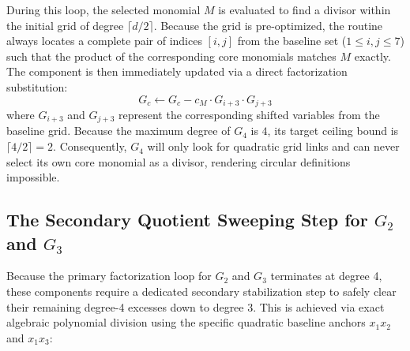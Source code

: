 \documentclass[11pt,a4paper]{article}
\begin{document}
During this loop, the selected monomial $M$ is evaluated to find a divisor within the initial grid of degree $\lceil d/2 \rceil$. Because the grid is pre-optimized, the routine always locates a complete pair of indices $[i, j]$ from the baseline set ($1 \le i, j \le 7$) such that the product of the corresponding core monomials matches $M$ exactly. The component is then immediately updated via a direct factorization substitution:
\begin{equation}
G_c \leftarrow G_c - c_M \cdot G_{i+3} \cdot G_{j+3}
\end{equation}
where $G_{i+3}$ and $G_{j+3}$ represent the corresponding shifted variables from the baseline grid. Because the maximum degree of $G_4$ is $4$, its target ceiling bound is $\lceil 4/2 \rceil = 2$. Consequently, $G_4$ will only look for quadratic grid links and can never select its own core monomial as a divisor, rendering circular definitions impossible.

\subsection{The Secondary Quotient Sweeping Step for $G_2$ and $G_3$}

Because the primary factorization loop for $G_2$ and $G_3$ terminates at degree 4, these components require a dedicated secondary stabilization step to safely clear their remaining degree-4 excesses down to degree 3. This is achieved via exact algebraic polynomial division using the specific quadratic baseline anchors $x_1 x_2$ and $x_1 x_3$:
\end{document}
